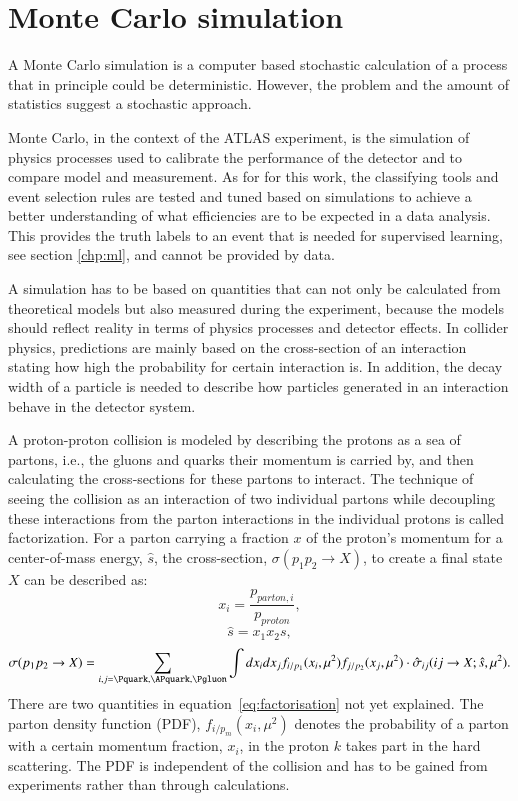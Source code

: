 \section{Monte Carlo simulation}

A Monte Carlo simulation is a computer based stochastic calculation of a process that in principle could be deterministic. However, the problem and the amount of statistics suggest a stochastic approach.

Monte Carlo, in the context of the ATLAS experiment, is the simulation of physics processes used to calibrate the performance of the detector and to compare model and measurement. As for for this work, the classifying tools and event selection rules are tested and tuned based on simulations to achieve a better understanding of what efficiencies are to be expected in a data analysis. This provides the truth labels to an event that is needed for supervised learning, see section \ref{chp:ml}, and cannot be provided by data.

A simulation has to be based on quantities that can not only be calculated from theoretical models but also measured during the experiment, because the models should reflect reality in terms of physics processes and detector effects. In collider physics, predictions are mainly based on  the cross-section of an interaction stating how high the probability for certain interaction is. In addition, the decay width of a particle is needed to describe how particles generated in an interaction behave in the detector system.

A proton-proton collision is modeled by describing the protons as a sea of partons, {i.e.}, the gluons and quarks their momentum is carried by, and then calculating the cross-sections for these partons to interact. The technique of seeing the collision as an interaction of two individual partons while decoupling these interactions from the parton interactions in the individual protons is called factorization.
For a parton carrying a fraction $x$ of the proton's momentum for a center-of-mass energy, $\hat{s}$, the cross-section, $\sigma(p_1 p_2 \rightarrow X)$, to create a final state $X$ can be described as:
%
\begin{equation}
	x_i = \frac{p_{parton,i}}{p_{proton}}, 
\end{equation}
%
%
\begin{equation}
	\hat{s} = x_1 x_2 s,
\end{equation}
%
%
\begin{align}
	\sigma ( p_1 p_2 \rightarrow X ) = \sum_{i,j = \Pquark, \APquark, \Pgluon} \int dx_i dx_j f_{i/p_1} ( x_i, \mu^2 ) f_{j/p_2} ( x_j, \mu^2 ) \cdot \hat{\sigma}_{ij} ( ij \rightarrow X; \hat{s}, \mu^2 ).
	\label{eq:factorisation}
\end{align}
%
There are two quantities in equation~\ref{eq:factorisation} not yet explained.
The parton density function (PDF), $f_{i/p_m} ( x_i, \mu^2 )$ denotes the probability of a parton with a certain momentum fraction, $x_i$, in the proton $k$ takes part in the hard scattering.
The PDF is independent of the collision and has to be gained from experiments rather than through calculations.

